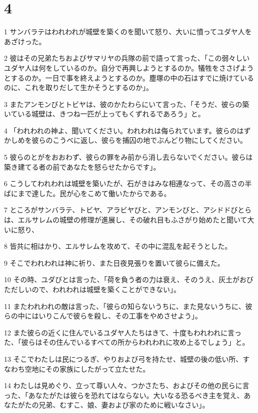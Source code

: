 \chapter{4}

\par 1 サンバラテはわれわれが城壁を築くのを聞いて怒り、大いに憤ってユダヤ人をあざけった。
\par 2 彼はその兄弟たちおよびサマリヤの兵隊の前で語って言った、「この弱々しいユダヤ人は何をしているのか。自分で再興しようとするのか。犠牲をささげようとするのか。一日で事を終えようとするのか。塵塚の中の石はすでに焼けているのに、これを取りだして生かそうとするのか」。
\par 3 またアンモンびとトビヤは、彼のかたわらにいて言った、「そうだ、彼らの築いている城壁は、きつね一匹が上ってもくずれるであろう」と。
\par 4 「われわれの神よ、聞いてください。われわれは侮られています。彼らのはずかしめを彼らのこうべに返し、彼らを捕囚の地でぶんどり物にしてください。
\par 5 彼らのとがをおおわず、彼らの罪をみ前から消し去らないでください。彼らは築き建てる者の前であなたを怒らせたからです」。
\par 6 こうしてわれわれは城壁を築いたが、石がきはみな相連なって、その高さの半ばにまで達した。民が心をこめて働いたからである。
\par 7 ところがサンバラテ、トビヤ、アラビヤびと、アンモンびと、アシドドびとらは、エルサレムの城壁の修理が進展し、その破れ目もふさがり始めたと聞いて大いに怒り、
\par 8 皆共に相はかり、エルサレムを攻めて、その中に混乱を起そうとした。
\par 9 そこでわれわれは神に祈り、また日夜見張りを置いて彼らに備えた。
\par 10 その時、ユダびとは言った、「荷を負う者の力は衰え、そのうえ、灰土がおびただしいので、われわれは城壁を築くことができない」。
\par 11 またわれわれの敵は言った、「彼らの知らないうちに、また見ないうちに、彼らの中にはいりこんで彼らを殺し、その工事をやめさせよう」。
\par 12 また彼らの近くに住んでいるユダヤ人たちはきて、十度もわれわれに言った、「彼らはその住んでいるすべての所からわれわれに攻め上るでしょう」と。
\par 13 そこでわたしは民につるぎ、やりおよび弓を持たせ、城壁の後の低い所、すなわち空地にその家族にしたがって立たせた。
\par 14 わたしは見めぐり、立って尊い人々、つかさたち、およびその他の民らに言った、「あなたがたは彼らを恐れてはならない。大いなる恐るべき主を覚え、あなたがたの兄弟、むすこ、娘、妻および家のために戦いなさい」。
